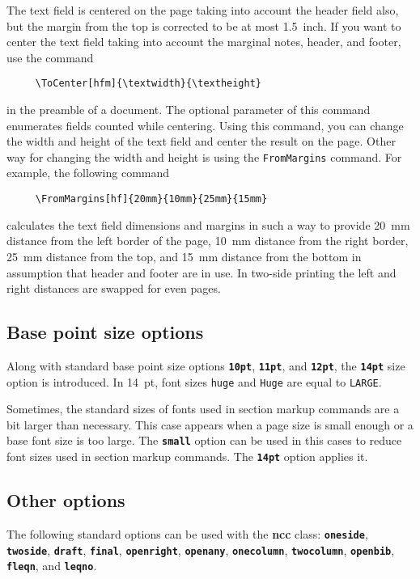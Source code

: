 \documentclass[11pt]{ncc}
\newcommand*\package[1]{\textbf{#1}}
\newcommand*\Opt[1]{\texttt{\textbf{#1}}}
\newcommand*\Meta[1]{\texttt{\upshape#1}}
\newcommand*\com[1]{\Meta{\symbol{"5C}#1}}
\begin{document}
The text field is centered on the page taking into account the
header field also, but the margin from the top is corrected
to be at most 1.5~inch. If you want to center the text field
taking into account the marginal notes, header, and footer, use
the command
\begin{verbatim}
     \ToCenter[hfm]{\textwidth}{\textheight}
\end{verbatim}
in the preamble of a document. The optional parameter of this
command enumerates fields counted while centering. Using this
command, you can change the width and height of the text field
and center the result on the page. Other way for changing the
width and height is using the \com{FromMargins} command. For
example, the following command
\begin{verbatim}
     \FromMargins[hf]{20mm}{10mm}{25mm}{15mm}
\end{verbatim}
calculates the text field dimensions and margins in such a way to
provide 20~mm distance from the left border of the page, 10~mm
distance from the right border, 25~mm distance from the top, and
15~mm distance from the bottom in assumption that header and
footer are in use. In two-side printing the left and right
distances are swapped for even pages.

\subsection{Base point size options}

Along with standard base point size options \Opt{10pt},
\Opt{11pt}, and \Opt{12pt}, the \Opt{14pt} size option is
introduced. In 14~pt, font sizes \com{huge} and \com{Huge} are
equal to \com{LARGE}.

Sometimes, the standard sizes of fonts used in section markup
commands are a bit larger than necessary. This case appears when
a page size is small enough or a base font size is too large. The
\Opt{small} option can be used in this cases to reduce font sizes
used in section markup commands. The \Opt{14pt} option applies it.

\subsection{Other options}

The following standard options can be used with the \package{ncc}
class: \Opt{oneside}, \Opt{twoside}, \Opt{draft}, \Opt{final},
\Opt{openright}, \Opt{openany}, \Opt{onecolumn}, \Opt{twocolumn},
\Opt{openbib}, \Opt{fleqn}, and \Opt{leqno}.
\end{document}
